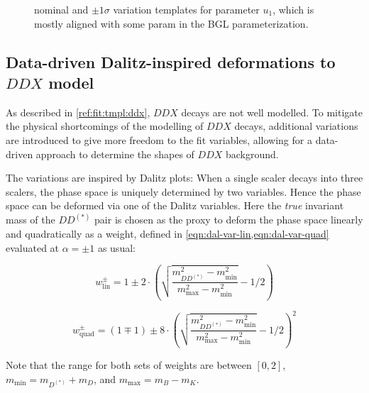\begin{figure}[htb]

    \caption{
        \Dz\mun nominal and $\pm 1\sigma$ variation templates for
        parameter $u_1$, which is mostly aligned with
        some param in the BGL parameterization.
    }
    \label{fig:fit-variations:ff}
\end{figure}


\subsection{Data-driven Dalitz-inspired deformations to $DDX$ model}
\label{ref:fit:var:ddx}

As described in \cref{ref:fit:tmpl:ddx}, $DDX$ decays are not well modelled.
To mitigate the physical shortcomings of the modelling of $DDX$ decays,
additional variations are introduced to give more freedom to the fit variables,
allowing for a data-driven approach to determine the shapes of $DDX$ background.

The variations are inspired by Dalitz plots:
When a single scaler decays into three scalers,
the phase space is uniquely determined by two variables.
Hence the phase space can be deformed via one of the Dalitz variables.
Here the \emph{true} invariant mass of the $DD^{(*)}$ pair is chosen as the
proxy to deform the phase space linearly and quadratically
as a weight, defined in \cref{eqn:dal-var-lin,eqn:dal-var-quad} evaluated at
$\alpha = \pm 1$ as usual:

\begin{equation}
    w_\text{lin}^\pm = 1 \pm 2 \cdot \left(\sqrt{
        \frac{m_{DD^{(*)}}^2 - m_\text{min}^2}{m_\text{max}^2 - m_\text{min}^2}
    } - 1/2 \right)
    \label{eqn:dal-var-lin}
\end{equation}

\begin{equation}
    w_\text{quad}^\pm = (1 \mp 1) \pm 8 \cdot
    \left(\sqrt{
        \frac{m_{DD^{(*)}}^2 - m_\text{min}^2}{m_\text{max}^2 - m_\text{min}^2}
    } - 1/2 \right)^2
    \label{eqn:dal-var-quad}
\end{equation}

Note that the range for both sets of weights are between $[0, 2]$,
$m_\text{min} = m_{D^{(*)}} + m_D$, and $m_\text{max} = m_B - m_K$.


